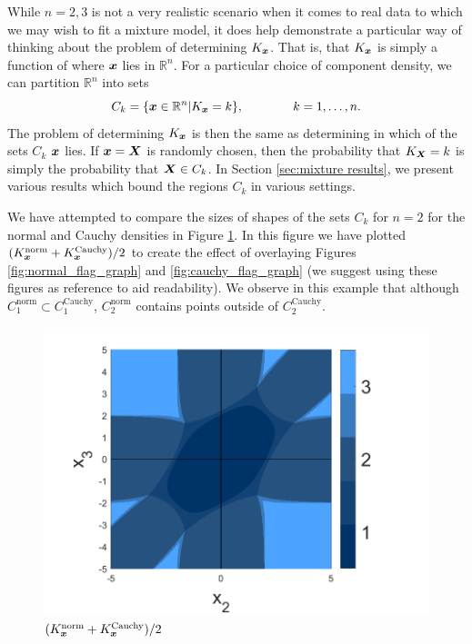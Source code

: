 	While $n = 2,3$ is not a very realistic scenario when it comes to real data to which we may wish to fit a mixture model, it does help demonstrate a particular way of thinking about the problem of determining $K_{\bm{{x}}}$. That is, that $K_{\bm{{x}}}$ is simply a function of where ${\bm{{x}}}$ lies in $\mathbb{R}^n$. For a particular choice of component density, we can partition $\mathbb{R}^n$ into sets 
	\begin{equation}
		C_k = \{ {\bm{{x}}} \in \mathbb{R}^n | K_{{\bm{{x}}}} = k \}, \hspace{40pt} k = 1,\dots,n.
		\label{eq: C_k partition sets}
	\end{equation}
	The problem of determining $K_{{\bm{{x}}}}$ is then the same as determining in which of the sets $C_k$ ${\bm{{x}}}$ lies. If ${\bm{{x}}} = {\bm{{X}}}$ is randomly chosen, then the probability that $K_{\bm{{X}}} = k$ is simply the probability that ${\bm{{X}}} \in C_k$. In Section \ref{sec:mixture results}, we present various results which bound the regions $C_k$ in various settings.

	We have attempted to compare the sizes of shapes of the sets $C_k$ for $n = 2$ for the normal and Cauchy densities in Figure \ref{fig:compare cauchy norm flag graph}. In this figure we have plotted $(K_{\bm{{x}}}^\mathrm{norm} + K_{\bm{{x}}}^\mathrm{Cauchy}) / 2$ to create the effect of overlaying Figures \ref{fig:normal_flag_graph} and \ref{fig:cauchy_flag_graph} (we suggest using these figures as reference to aid readability). We observe in this example that although $C_1^\mathrm{norm} \subset C_1^\mathrm{Cauchy}$, $C_2^\mathrm{norm}$ contains points outside of $C_2^\mathrm{Cauchy}$.




	\begin{figure}
		\centering
		\includegraphics[width = \textwidth]{Figures/Mixtures/norm_cauchy_compare_flag_graph.png}
		\caption{$(K_{\bm{{x}}}^\mathrm{norm} + K_{\bm{{x}}}^\mathrm{Cauchy}) / 2$}
		\label{fig:compare cauchy norm flag graph}
	\end{figure}

